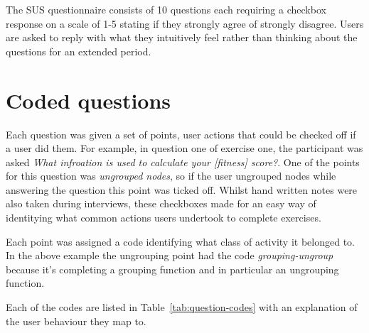 The SUS questionnaire consists of 10 questions each requiring a checkbox response on a scale of 1-5 stating if they strongly agree of strongly disagree. Users are asked to reply with what they intuitively feel rather than thinking about the questions for an extended period. 

\section{Coded questions}
\label{sec:coded_questions}

Each question was given a set of points, user actions that could be checked off if a user did them. For example, in question one of exercise one, the participant was asked \textit{What infroation is used to calculate your [fitness] score?}. One of the points for this question was \textit{ungrouped nodes}, so if the user ungrouped nodes while answering the question this point was ticked off. Whilst hand written notes were also taken during interviews, these checkboxes made for an easy way of identitying what common actions users undertook to complete exercises. 

Each point was assigned a code identifying what class of activity it belonged to. In the above example the ungrouping point had the code \textit{grouping-ungroup} because it's completing a grouping function and in particular an ungrouping function. 

Each of the codes are listed in Table~\ref{tab:question-codes} with an explanation of the user behaviour they map to.


